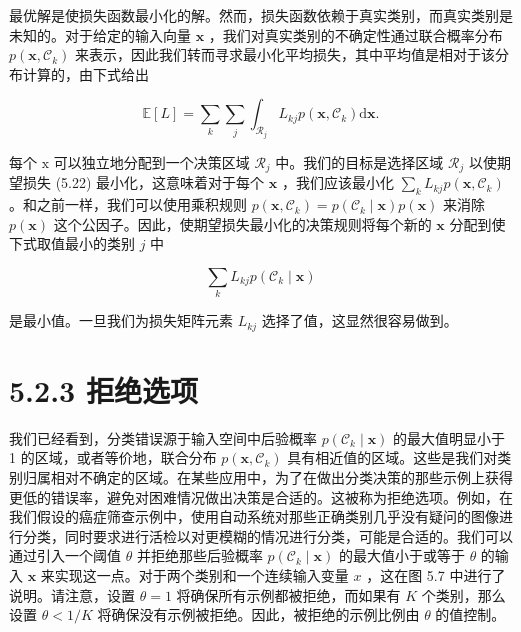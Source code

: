 \documentclass[10pt]{article}
\begin{document}
\begin{center}
\end{center}

最优解是使损失函数最小化的解。然而，损失函数依赖于真实类别，而真实类别是未知的。对于给定的输入向量 \(\mathbf{x}\) ，我们对真实类别的不确定性通过联合概率分布 \(p\left( {\mathbf{x},{\mathcal{C}}_{k}}\right)\) 来表示，因此我们转而寻求最小化平均损失，其中平均值是相对于该分布计算的，由下式给出

\[
\mathbb{E}\left\lbrack  L\right\rbrack   = \mathop{\sum }\limits_{k}\mathop{\sum }\limits_{j}{\int }_{{\mathcal{R}}_{j}}{L}_{kj}p\left( {\mathbf{x},{\mathcal{C}}_{k}}\right) \mathrm{d}\mathbf{x}. \tag{5.22}
\]

每个 \(\mathrm{x}\) 可以独立地分配到一个决策区域 \({\mathcal{R}}_{j}\) 中。我们的目标是选择区域 \({\mathcal{R}}_{j}\) 以使期望损失 (5.22) 最小化，这意味着对于每个 \(\mathbf{x}\) ，我们应该最小化 \(\mathop{\sum }\limits_{k}{L}_{kj}p\left( {\mathbf{x},{\mathcal{C}}_{k}}\right)\) 。和之前一样，我们可以使用乘积规则 \(p\left( {\mathbf{x},{\mathcal{C}}_{k}}\right)  = p\left( {{\mathcal{C}}_{k} \mid  \mathbf{x}}\right) p\left( \mathbf{x}\right)\) 来消除 \(p\left( \mathbf{x}\right)\) 这个公因子。因此，使期望损失最小化的决策规则将每个新的 \(\mathbf{x}\) 分配到使下式取值最小的类别 \(j\) 中

\[
\mathop{\sum }\limits_{k}{L}_{kj}p\left( {{\mathcal{C}}_{k} \mid  \mathbf{x}}\right)  \tag{5.23}
\]

是最小值。一旦我们为损失矩阵元素 \({L}_{kj}\) 选择了值，这显然很容易做到。

\section*{5.2.3 拒绝选项}

我们已经看到，分类错误源于输入空间中后验概率 \(p\left( {{\mathcal{C}}_{k} \mid  \mathbf{x}}\right)\) 的最大值明显小于 1 的区域，或者等价地，联合分布 \(p\left( {\mathbf{x},{\mathcal{C}}_{k}}\right)\) 具有相近值的区域。这些是我们对类别归属相对不确定的区域。在某些应用中，为了在做出分类决策的那些示例上获得更低的错误率，避免对困难情况做出决策是合适的。这被称为拒绝选项。例如，在我们假设的癌症筛查示例中，使用自动系统对那些正确类别几乎没有疑问的图像进行分类，同时要求进行活检以对更模糊的情况进行分类，可能是合适的。我们可以通过引入一个阈值 \(\theta\) 并拒绝那些后验概率 \(p\left( {{\mathcal{C}}_{k} \mid  \mathbf{x}}\right)\) 的最大值小于或等于 \(\theta\) 的输入 \(\mathbf{x}\) 来实现这一点。对于两个类别和一个连续输入变量 \(x\) ，这在图 5.7 中进行了说明。请注意，设置 \(\theta  = 1\) 将确保所有示例都被拒绝，而如果有 \(K\) 个类别，那么设置 \(\theta  < 1/K\) 将确保没有示例被拒绝。因此，被拒绝的示例比例由 \(\theta\) 的值控制。
\end{document}
